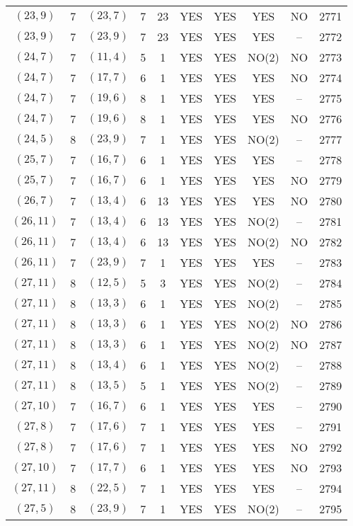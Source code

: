 \begin{longtable}{|c|c|c|c|c|c|c|c|c|c|}
$(23, 9)$ & 7 & $(23, 7)$ & 7 & 23 & YES & YES & YES & NO & 2771\\
$(23, 9)$ & 7 & $(23, 9)$ & 7 & 23 & YES & YES & YES & -- & 2772\\
$(24, 7)$ & 7 & $(11, 4)$ & 5 & 1 & YES & YES & NO(2) & NO & 2773\\
$(24, 7)$ & 7 & $(17, 7)$ & 6 & 1 & YES & YES & YES & NO & 2774\\
$(24, 7)$ & 7 & $(19, 6)$ & 8 & 1 & YES & YES & YES & -- & 2775\\
$(24, 7)$ & 7 & $(19, 6)$ & 8 & 1 & YES & YES & YES & NO & 2776\\
$(24, 5)$ & 8 & $(23, 9)$ & 7 & 1 & YES & YES & NO(2) & -- & 2777\\
$(25, 7)$ & 7 & $(16, 7)$ & 6 & 1 & YES & YES & YES & -- & 2778\\
$(25, 7)$ & 7 & $(16, 7)$ & 6 & 1 & YES & YES & YES & NO & 2779\\
$(26, 7)$ & 7 & $(13, 4)$ & 6 & 13 & YES & YES & YES & NO & 2780\\
$(26, 11)$ & 7 & $(13, 4)$ & 6 & 13 & YES & YES & NO(2) & -- & 2781\\
$(26, 11)$ & 7 & $(13, 4)$ & 6 & 13 & YES & YES & NO(2) & NO & 2782\\
$(26, 11)$ & 7 & $(23, 9)$ & 7 & 1 & YES & YES & YES & -- & 2783\\
$(27, 11)$ & 8 & $(12, 5)$ & 5 & 3 & YES & YES & NO(2) & -- & 2784\\
$(27, 11)$ & 8 & $(13, 3)$ & 6 & 1 & YES & YES & NO(2) & -- & 2785\\
$(27, 11)$ & 8 & $(13, 3)$ & 6 & 1 & YES & YES & NO(2) & NO & 2786\\
$(27, 11)$ & 8 & $(13, 3)$ & 6 & 1 & YES & YES & NO(2) & NO & 2787\\
$(27, 11)$ & 8 & $(13, 4)$ & 6 & 1 & YES & YES & NO(2) & -- & 2788\\
$(27, 11)$ & 8 & $(13, 5)$ & 5 & 1 & YES & YES & NO(2) & -- & 2789\\
$(27, 10)$ & 7 & $(16, 7)$ & 6 & 1 & YES & YES & YES & -- & 2790\\
$(27, 8)$ & 7 & $(17, 6)$ & 7 & 1 & YES & YES & YES & -- & 2791\\
$(27, 8)$ & 7 & $(17, 6)$ & 7 & 1 & YES & YES & YES & NO & 2792\\
$(27, 10)$ & 7 & $(17, 7)$ & 6 & 1 & YES & YES & YES & NO & 2793\\
$(27, 11)$ & 8 & $(22, 5)$ & 7 & 1 & YES & YES & YES & -- & 2794\\
$(27, 5)$ & 8 & $(23, 9)$ & 7 & 1 & YES & YES & NO(2) & -- & 2795\\

\end{longtable}
